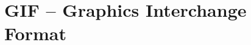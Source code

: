 \begin{comment}
  
\end{comment}

\chapter{GIF -- Graphics Interchange Format}
\label{cha:gif}

\begin{refsection}

  \printbibliography[heading=subbibliography]

\end{refsection}